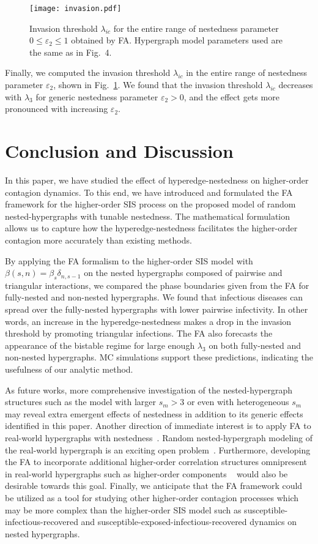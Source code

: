 \documentclass[aps,pre,twocolumn,nofootinbib,superscriptaddress,showpacs,showkeys]{revtex4-1}
\begin{document}
\begin{figure}    
\centering
    \texttt{[image: invasion.pdf]}
    \caption{Invasion threshold $\lambda_{ic}$ for the entire range of nestedness parameter $0\le\varepsilon_2\le1$ obtained by FA. Hypergraph model parameters used are the same as in Fig.~4.}
    \label{fig:Fig_invasion}
\end{figure}

Finally, we computed the invasion threshold $\lambda_{ic}$ in the entire range of nestedness parameter $\varepsilon_2$, shown in Fig.~\ref{fig:Fig_invasion}. We found that the invasion threshold $\lambda_{ic}$ decreases with $\lambda_3$ for generic nestedness parameter $\varepsilon_2>0$, and the effect gets more pronounced with increasing $\varepsilon_2$.

\section{Conclusion and Discussion} 
In this paper, we have studied the effect of hyperedge-nestedness on higher-order contagion dynamics.
To this end, we have introduced and formulated the FA framework for the higher-order SIS process on the proposed model of random nested-hypergraphs with tunable nestedness. 
The mathematical formulation allows us to capture how the hyperedge-nestedness facilitates the higher-order contagion more accurately than existing methods.

By applying the FA formalism to the higher-order SIS model with $\beta(s,n)=\beta_{s}\delta_{n,s-1}$ on the nested hypergraphs composed of pairwise and triangular interactions, we compared the phase boundaries given from the FA for fully-nested and non-nested hypergraphs. We  
found that infectious diseases can spread over the fully-nested hypergraphs with lower pairwise infectivity. In other words, an increase in the hyperedge-nestedness makes a drop in the invasion threshold by promoting triangular infections. 
The FA also forecasts the appearance of the bistable regime for large enough $\lambda_3$ on both fully-nested and non-nested hypergraphs. MC simulations support these predictions, indicating the usefulness of our analytic method.  

As future works, more comprehensive investigation of the nested-hypergraph structures such as the model with larger $s_m>3$ or even with heterogeneous $s_m$ may reveal extra emergent effects of nestedness in addition to its generic effects identified in this paper.
Another direction of immediate interest is to apply FA to real-world hypergraphs with nestedness~\cite{motif}. Random nested-hypergraph modeling of the real-world hypergraph is an exciting open problem~\cite{recon}. 
Furthermore, developing the FA to incorporate additional higher-order correlation structures omnipresent in real-world hypergraphs such as higher-order components ~\cite{jungho} would also be desirable towards this goal.
Finally,
we anticipate that the FA framework could be utilized as a tool for studying other higher-order contagion processes which may be more complex than the higher-order SIS model such as susceptible-infectious-recovered and susceptible-exposed-infectious-recovered dynamics on nested hypergraphs. 
\end{document}
